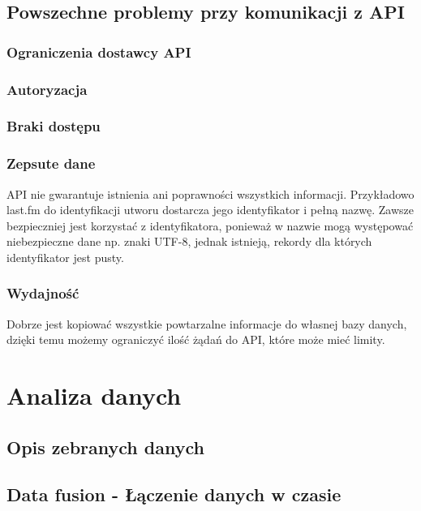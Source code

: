 \documentclass[brudnopis]{xmgr}
\begin{document}
    \section{Powszechne problemy przy komunikacji z API}

        \subsection*{Ograniczenia dostawcy API}

        \subsection*{Autoryzacja}

        \subsection*{Braki dostępu}

        \subsection*{Zepsute dane}
        API nie gwarantuje istnienia ani poprawności wszystkich informacji.
        Przykładowo last.fm do identyfikacji utworu dostarcza jego identyfikator i pełną nazwę.
        Zawsze bezpieczniej jest korzystać z identyfikatora, ponieważ w nazwie mogą występować niebezpieczne dane np. znaki UTF-8,
        jednak istnieją, rekordy dla których identyfikator jest pusty.

        \subsection*{Wydajność}
        Dobrze jest kopiować wszystkie powtarzalne informacje do własnej bazy danych,
        dzięki temu możemy ograniczyć ilość żądań do API, które może mieć limity.

\chapter{Analiza danych}

    \section{Opis zebranych danych}

    \section{Data fusion - Łączenie danych w czasie}
\end{document}
